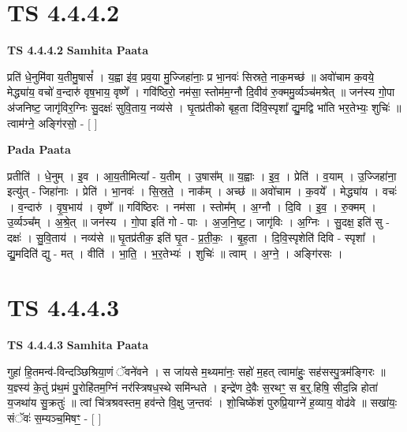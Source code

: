 \documentclass[17pt]{extarticle}
\begin{document}

\section{ TS 4.4.4.2 }

\textbf{TS 4.4.4.2 } \newline
\textbf{Samhita Paata} \newline

प्रति॑ धे॒नुमि॑वा य॒तीमु॒षासं᳚ । य॒ह्वा इ॑व॒ प्रव॒या मु॒ज्जिहा॑नाः॒ प्र भा॒नवः॑ सिस्रते॒ नाक॒मच्छ॑ ॥ अवो॑चाम क॒वये॒ मेद्ध्या॑य॒ वचो॑ व॒न्दारु॑ वृष॒भाय॒ वृष्णे᳚ । गवि॑ष्ठिरो॒ नम॑सा॒ स्तोम॑म॒ग्नौ दि॒वीव॑ रु॒क्ममु॒र्व्यञ्च॑मश्रेत् ॥ जन॑स्य गो॒पा अ॑जनिष्ट॒ जागृ॑विर॒ग्निः सु॒दक्षः॑ सुवि॒ताय॒ नव्य॑से । घृ॒तप्र॑तीको बृह॒ता दि॑वि॒स्पृशा᳚ द्यु॒मद्वि भा॑ति भर॒तेभ्यः॒ शुचिः॑ ॥ त्वाम॑ग्ने॒ अङ्गि॑रसो॒ - [  ] \newline

\textbf{Pada Paata} \newline

प्रतीति॑ । धे॒नुम् । इ॒व । आ॒य॒तीमित्या᳚ - य॒तीम् । उ॒षास᳚म् ॥ य॒ह्वाः । इ॒व॒ । प्रेति॑ । व॒याम् । उ॒ज्जिहा॑ना॒ इत्यु॑त् - जिहा॑नाः । प्रेति॑ । भा॒नवः॑ । सि॒स्र॒ते॒ । नाक᳚म् । अच्छ॑ ॥ अवो॑चाम । क॒वये᳚ । मेद्ध्या॑य । वचः॑ । व॒न्दारु॑ । वृ॒ष॒भाय॑ । वृष्णे᳚ ॥ गवि॑ष्ठिरः । नम॑सा । स्तोम᳚म् । अ॒ग्नौ । दि॒वि । इ॒व॒ । रु॒क्मम् । उ॒र्व्यञ्च᳚म् । अ॒श्रे॒त् ॥ जन॑स्य । गो॒पा इति॑ गो - पाः । अ॒ज॒नि॒ष्ट॒। जागृ॑विः । अ॒ग्निः । सु॒दक्ष॒ इति॑ सु - दक्षः॑ । सु॒वि॒ताय॑ । नव्य॑से ॥ घृ॒तप्र॑तीक॒ इति॑ घृ॒त - प्र॒ती॒कः॒ । बृ॒ह॒ता । दि॒वि॒स्पृशेति॑ दिवि - स्पृशा᳚ । द्यु॒मदिति॑ द्यु - मत् । वीति॑ । भा॒ति॒ । भ॒र॒तेभ्यः॑ । शुचिः॑ ॥ त्वाम् । अ॒ग्ने॒ । अङ्गि॑रसः ।  \newline





\section{ TS 4.4.4.3 }

\textbf{TS 4.4.4.3 } \newline
\textbf{Samhita Paata} \newline

गुहा॑ हि॒तमन्व॑-विन्दञ्छिश्रिया॒णं ॅवने॑वने । स जा॑यसे म॒थ्यमा॑नः॒ सहो॑ म॒हत् त्वामा॑हुः॒ सह॑सस्पु॒त्रम॑ङ्गिरः ॥ य॒ज्ञ्स्य॑ के॒तुं प्र॑थ॒मं पु॒रोहि॑तम॒ग्निं नर॑स्त्रिषध॒स्थे समि॑न्धते । इन्द्रे॑ण दे॒वैः स॒रथꣳ॒॒ स ब॒र्॒.हिषि॒ सीद॒न्नि होता॑ य॒जथा॑य सु॒क्रतुः॑ ॥ त्वां चि॑त्रश्रवस्तम॒ हव॑न्ते वि॒क्षु ज॒न्तवः॑ । शो॒चिष्के॑शं पुरुप्रि॒याग्ने॑ ह॒व्याय॒ वोढ॑वे ॥ सखा॑यः॒ संॅवः॑ स॒म्यञ्च॒मिषꣳ॒॒ - [  ] \newline
\end{document}
